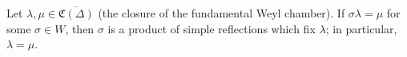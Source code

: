 Let $\lambda, \mu \in \overline{\mathfrak{C}(\Delta)}$ (the closure of the fundamental Weyl chamber). If $\sigma \lambda = \mu$ for some $\sigma \in W$, then $\sigma$ is a product of simple reflections which fix $\lambda$; in particular, $\lambda = \mu$.